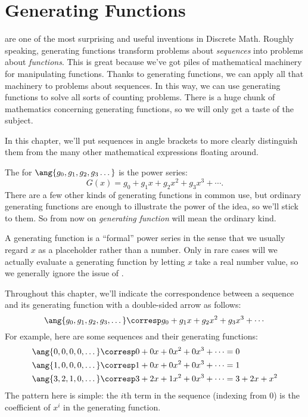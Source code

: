 \chapter{Generating Functions}\label{generating_function_chap}

 are one of the most surprising and useful
inventions in Discrete Math.  Roughly speaking, generating functions
transform problems about \textit{sequences} into problems about
\textit{functions}.  This is great because we've got piles of mathematical
machinery for manipulating functions.  Thanks to generating functions, we
can apply all that machinery to problems about sequences.  In this way, we
can use generating functions to solve all sorts of counting problems.
There is a huge chunk of mathematics concerning generating functions, so
we will only get a taste of the subject.

In this chapter, we'll put sequences in angle brackets to more clearly
distinguish them from the many other mathematical expressions floating
around.

The  for $\ang{g_0, g_1, g_2, g_3
  \dots}$ is the power series:
\[
G(x) = g_0 + g_1 x + g_2 x^2 + g_3 x^3 + \cdots.
\]
There are a few other kinds of generating functions in common use,
but ordinary generating functions are enough to illustrate the power of
the idea, so we'll stick to them.  So from now on \emph{generating
  function} will mean the ordinary kind.

A generating function is a ``formal'' power series in the sense that we
usually regard $x$ as a placeholder rather than a number.  Only in rare
cases will we actually evaluate a generating function by letting $x$ take
a real number value, so we generally ignore the issue of .

Throughout this chapter, we'll indicate the correspondence between a
sequence and its generating function with a double-sided arrow as
follows:
%
\[
\ang{g_0, g_1, g_2, g_3, \dots}
    \corresp g_0 + g_1 x + g_2 x^2 + g_3 x^3 + \cdots
\]
%
For example, here are some sequences and their generating functions:
%
\begin{align*}
\ang{0, 0, 0, 0, \dots}
    & \corresp 0 + 0 x + 0 x^2 + 0 x^3 + \cdots = 0 \\
\ang{1, 0, 0, 0, \dots}
    & \corresp 1 + 0 x + 0 x^2 + 0 x^3 + \cdots = 1 \\
\ang{3, 2, 1, 0, \dots}
    & \corresp 3 + 2 x + 1 x^2 + 0 x^3 + \cdots = 3 + 2 x + x^2
\end{align*}
%
The pattern here is simple: the $i$th term in the sequence (indexing
from 0) is the coefficient of $x^i$ in the generating function.

